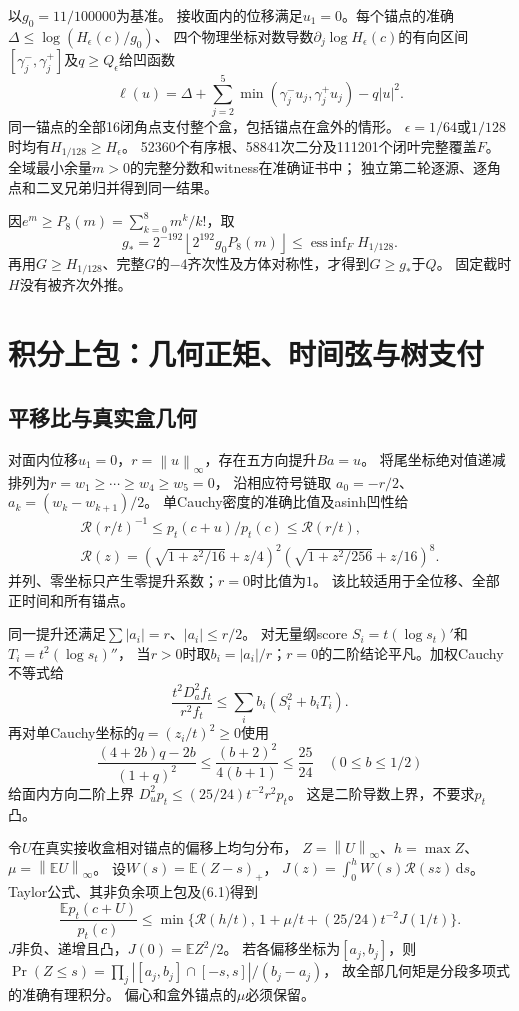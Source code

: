 \documentclass[UTF8,fontset=fandol,zihao=-4,a4paper]{ctexart}
\newcommand{\E}{\mathbb E}
\newcommand{\1}{\mathbf 1}
\newcommand{\dd}{\,\mathrm d}
\newcommand{\norm}[1]{\left\lVert#1\right\rVert}
\DeclareMathOperator{\essinf}{ess\,inf}
\begin{document}
以$g_0=11/100000$为基准。
接收面内的位移满足$u_1=0$。每个锚点的准确$\Delta\le\log(H_\epsilon(c)/g_0)$、
四个物理坐标对数导数$\partial_j\log H_\epsilon(c)$的有向区间
$[\gamma_j^-,\gamma_j^+]$及$q\ge Q_\epsilon$给凹函数
\[
 \ell(u)=\Delta+\sum_{j=2}^5\min(\gamma_j^-u_j,\gamma_j^+u_j)-q|u|^2.
\]
同一锚点的全部16闭角点支付整个盒，包括锚点在盒外的情形。
$\epsilon=1/64$或$1/128$时均有$H_{1/128}\ge H_\epsilon$。
52360个有序根、58841次二分及111201个闭叶完整覆盖$F$。
全域最小余量$m>0$的完整分数和witness在准确证书中；
独立第二轮逐源、逐角点和二叉兄弟归并得到同一结果。

因$e^m\ge P_8(m)=\sum_{k=0}^8m^k/k!$，取
\[
 g_* =2^{-192}\left\lfloor2^{192}g_0P_8(m)\right\rfloor
 \le\essinf_FH_{1/128}.
 \tag{5.3}
\]
再用$G\ge H_{1/128}$、完整$G$的$-4$齐次性及方体对称性，才得到$G\ge g_*$于$Q$。
固定截时$H$没有被齐次外推。

\section{积分上包：几何正矩、时间弦与树支付}
\subsection{平移比与真实盒几何}
对面内位移$u_1=0$，$r=\norm u_\infty$，存在五方向提升$Ba=u$。
将尾坐标绝对值递减排列为$r=w_1\ge\cdots\ge w_4\ge w_5=0$，
沿相应符号链取
$a_0=-r/2$、$a_k=(w_k-w_{k+1})/2$。
单Cauchy密度的准确比值及asinh凹性给
\[
 \begin{gathered}
 \mathcal R(r/t)^{-1}\le p_t(c+u)/p_t(c)\le\mathcal R(r/t),\\
 \mathcal R(z)=
 (\sqrt{1+z^2/16}+z/4)^2(\sqrt{1+z^2/256}+z/16)^8.
 \end{gathered} \tag{6.1}
\]
并列、零坐标只产生零提升系数；$r=0$时比值为$1$。
该比较适用于全位移、全部正时间和所有锚点。

同一提升还满足$\sum|a_i|=r$、$|a_i|\le r/2$。
对无量纲score $S_i=t(\log s_t)'$和$T_i=t^2(\log s_t)''$，
当$r>0$时取$b_i=|a_i|/r$；$r=0$的二阶结论平凡。加权Cauchy不等式给
\[
 \frac{t^2D_a^2f_t}{r^2f_t}
 \le\sum_i b_i(S_i^2+b_iT_i).
\]
再对单Cauchy坐标的$q=(z_i/t)^2\ge0$使用
\[
 \frac{(4+2b)q-2b}{(1+q)^2}\le\frac{(b+2)^2}{4(b+1)}
 \le\frac{25}{24}\quad(0\le b\le1/2)
\]
给面内方向二阶上界
$D_u^2p_t\le(25/24)t^{-2}r^2p_t$。
这是二阶导数上界，不要求$p_t$凸。

令$U$在真实接收盒相对锚点的偏移上均匀分布，
$Z=\norm U_\infty$、$h=\max Z$、$\mu=\norm{\E U}_\infty$。
设$W(s)=\E(Z-s)_+$，
$J(z)=\int_0^hW(s)\mathcal R(sz)\dd s$。
Taylor公式、其非负余项上包及(6.1)得到
\[
 \frac{\E p_t(c+U)}{p_t(c)}
 \le\min\{\mathcal R(h/t),\,1+\mu/t+(25/24)t^{-2}J(1/t)\}. \tag{6.2}
\]
$J$非负、递增且凸，$J(0)=\E Z^2/2$。
若各偏移坐标为$[a_j,b_j]$，则
$\Pr(Z\le s)=\prod_j|[a_j,b_j]\cap[-s,s]|/(b_j-a_j)$，
故全部几何矩是分段多项式的准确有理积分。
偏心和盒外锚点的$\mu$必须保留。
\end{document}

